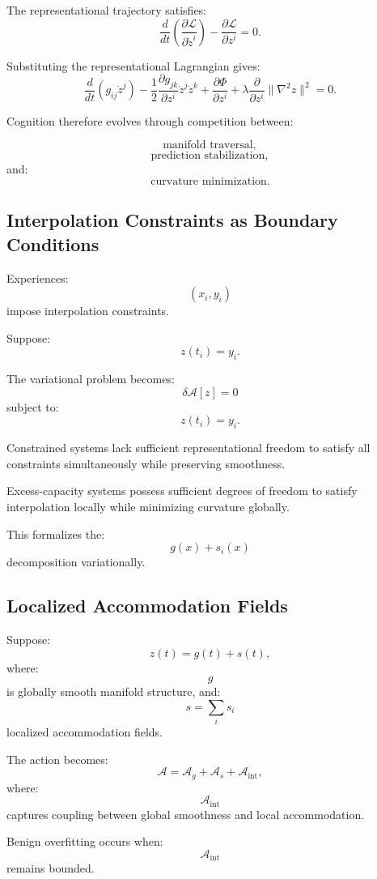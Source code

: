 \documentclass[12pt,a4paper]{article}
\begin{document}
The representational trajectory satisfies:
\[
\frac{d}{dt}
\left(
\frac{\partial \mathcal{L}}{\partial \dot{z}^i}
\right)
-
\frac{\partial \mathcal{L}}{\partial z^i}
=
0.
\]

Substituting the representational Lagrangian gives:
\[
\frac{d}{dt}
\left(
g_{ij}\dot{z}^j
\right)
-
\frac{1}{2}
\frac{\partial g_{jk}}{\partial z^i}
\dot{z}^j
\dot{z}^k
+
\frac{\partial \Phi}{\partial z^i}
+
\lambda
\frac{\partial}{\partial z^i}
\|\nabla^2 z\|^2
=
0.
\]

Cognition therefore evolves through competition between:

\[
\text{manifold traversal},
\]
\[
\text{prediction stabilization},
\]
and:
\[
\text{curvature minimization}.
\]

\subsection{Interpolation Constraints as Boundary Conditions}

Experiences:
\[
(x_i,y_i)
\]
impose interpolation constraints.

Suppose:
\[
z(t_i)=y_i.
\]

The variational problem becomes:
\[
\delta
\mathcal{A}[z]
=
0
\]
subject to:
\[
z(t_i)=y_i.
\]

Constrained systems lack sufficient representational freedom to satisfy all constraints simultaneously while preserving smoothness.

Excess-capacity systems possess sufficient degrees of freedom to satisfy interpolation locally while minimizing curvature globally.

This formalizes the:
\[
g(x)+s_i(x)
\]
decomposition variationally.

\subsection{Localized Accommodation Fields}

Suppose:
\[
z(t)
=
g(t)
+
s(t),
\]
where:
\[
g
\]
is globally smooth manifold structure,
and:
\[
s
=
\sum_i s_i
\]
localized accommodation fields.

The action becomes:
\[
\mathcal{A}
=
\mathcal{A}_g
+
\mathcal{A}_s
+
\mathcal{A}_{\text{int}},
\]
where:
\[
\mathcal{A}_{\text{int}}
\]
captures coupling between global smoothness and local accommodation.

Benign overfitting occurs when:
\[
\mathcal{A}_{\text{int}}
\]
remains bounded.
\end{document}
